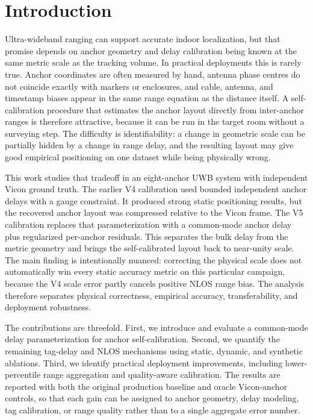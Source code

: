 \section{Introduction}
Ultra-wideband ranging can support accurate indoor localization, but that promise depends on anchor geometry and delay calibration being known at the same metric scale as the tracking volume. In practical deployments this is rarely true. Anchor coordinates are often measured by hand, antenna phase centres do not coincide exactly with markers or enclosures, and cable, antenna, and timestamp biases appear in the same range equation as the distance itself. A self-calibration procedure that estimates the anchor layout directly from inter-anchor ranges is therefore attractive, because it can be run in the target room without a surveying step. The difficulty is identifiability: a change in geometric scale can be partially hidden by a change in range delay, and the resulting layout may give good empirical positioning on one dataset while being physically wrong.

This work studies that tradeoff in an eight-anchor UWB system with independent Vicon ground truth. The earlier V4 calibration used bounded independent anchor delays with a gauge constraint. It produced strong static positioning results, but the recovered anchor layout was compressed relative to the Vicon frame. The V5 calibration replaces that parameterization with a common-mode anchor delay plus regularized per-anchor residuals. This separates the bulk delay from the metric geometry and brings the self-calibrated layout back to near-unity scale. The main finding is intentionally nuanced: correcting the physical scale does not automatically win every static accuracy metric on this particular campaign, because the V4 scale error partly cancels positive NLOS range bias. The analysis therefore separates physical correctness, empirical accuracy, transferability, and deployment robustness.

The contributions are threefold. First, we introduce and evaluate a common-mode delay parameterization for anchor self-calibration. Second, we quantify the remaining tag-delay and NLOS mechanisms using static, dynamic, and synthetic ablations. Third, we identify practical deployment improvements, including lower-percentile range aggregation and quality-aware calibration. The results are reported with both the original production baseline and oracle Vicon-anchor controls, so that each gain can be assigned to anchor geometry, delay modeling, tag calibration, or range quality rather than to a single aggregate error number.

